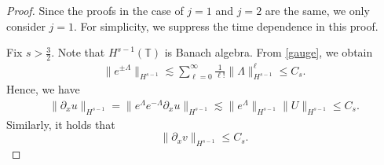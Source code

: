 \documentclass[%
11pt,  reqno]{amsart}
\newcommand{\T}{\mathbb{T}}
\newcommand{\Ld}{\Lambda}
\newcommand{\dx}{\partial_x}
\renewcommand{\l}{\ell}
\newcommand{\les}{\lesssim}
\numberwithin{equation}{section}
\numberwithin{theorem}{section}
\begin{document}
\begin{proof} 
Since the proofs in the case of $j=1$ and $j=2$ are the same, we only consider $j=1$.
For simplicity, we suppress the time dependence in this proof.

Fix $s > \frac 32$. 
Note that $H^{s-1} (\T)$ is Banach algebra.
From \eqref{gauge}, we obtain 
\begin{equation}
\begin{aligned}
\| e^{\pm \Ld} \|_{H^{s-1}} 
\les \sum_{\l = 0}^\infty \frac 1{\l !} \| \Ld \|_{H^{s-1}}^\l
\le
C_s. 
\label{p:eLd}
\end{aligned}
\end{equation}
Hence, we have
\begin{equation}
\begin{aligned}
\| \dx u \|_{H^{s-1}}
=
\|e^{\Ld} e^{-\Ld} \dx u\|_{H^{s-1}} 
\les
\|e^{\Ld}\|_{H^{s-1}} \|U\|_{H^{s-1}}
\le
C_s.
\end{aligned}
\label{es:dxu}
\end{equation}
Similarly, it holds that
\begin{equation}
\| \dx v \|_{H^{s-1}} \le C_s.
\label{es:dxv}
\end{equation}




\end{proof}
\end{document}
